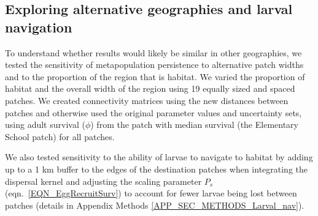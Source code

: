 \documentclass[12pt, oneside]{article}   	%
\begin{document}



\subsection*{Exploring alternative geographies and larval navigation}

To understand whether results would likely be similar in other geographies, we tested the sensitivity of metapopulation persistence to alternative patch widths and to the proportion of the region that is habitat. We varied the proportion of habitat and the overall width of the region using 19 equally sized and spaced patches. We created connectivity matrices using the new distances between patches and otherwise used the original parameter values and uncertainty sets, using adult survival ($\phi$) from the patch with median survival (the Elementary School patch) for all patches.

We also tested sensitivity to the ability of larvae to navigate to habitat by adding up to a 1 km buffer to the edges of the destination patches when integrating the dispersal kernel and adjusting the scaling parameter $P_s$ (eqn.\ \ref{EQN_EggRecruitSurv}) to account for fewer larvae being lost between patches (details in Appendix Methods \ref{APP_SEC_METHODS_Larval_nav}).
\end{document}

